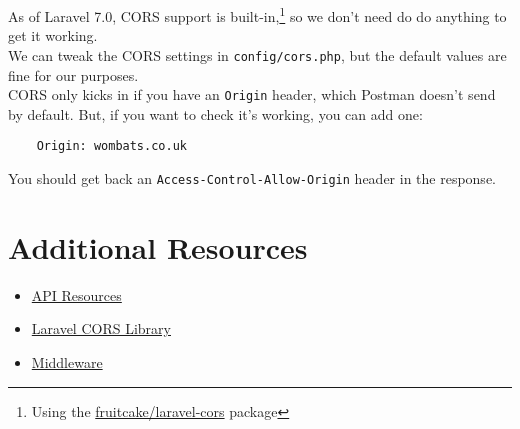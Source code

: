 As of Laravel 7.0, CORS support is built-in,\footnote{Using the  \href{https://github.com/fruitcake/laravel-cors}{fruitcake/laravel-cors} package} so we don't need do do anything to get it working.
\\

We can tweak the CORS settings in \texttt{config/cors.php}, but the default values are fine for our purposes.
\\

CORS only kicks in if you have an \texttt{Origin} header, which Postman doesn't send by default. But, if you want to check it's working, you can add one:

\begin{verbatim}
    Origin: wombats.co.uk
\end{verbatim}

You should get back an \texttt{Access-Control-Allow-Origin} header in the response.



\section{Additional Resources}

\begin{itemize}[leftmargin=*]
    \item \href{https://laravel.com/docs/master/eloquent-resources}{API Resources}
    \item \href{https://github.com/barryvdh/laravel-cors}{Laravel CORS Library}
    \item \href{http://laravel.com/docs/master/middleware}{Middleware}
\end{itemize}
